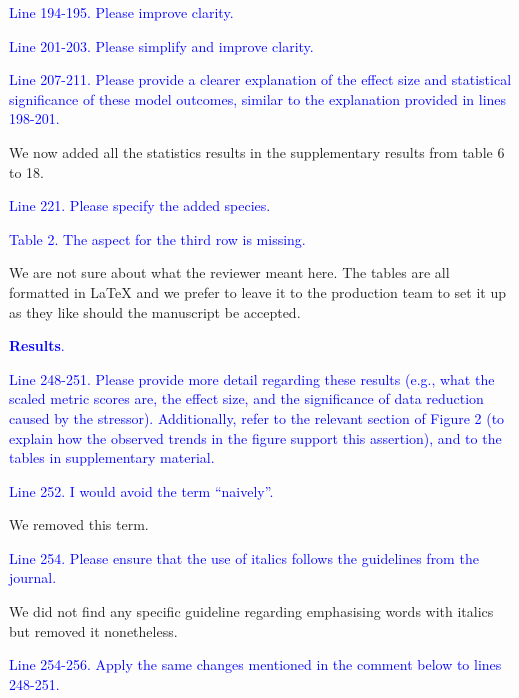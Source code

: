 \documentclass[
]{article}
\begin{document}
\textcolor{blue}{Line 194-195. Please improve clarity.}


\textcolor{blue}{Line 201-203. Please simplify and improve clarity.}


\textcolor{blue}{Line 207-211. Please provide a clearer explanation of the effect size and statistical significance of these model outcomes, similar to the explanation provided in lines 198-201.}

We now added all the statistics results in the supplementary results from table 6 to 18.

\textcolor{blue}{Line 221. Please specify the added species.}


\textcolor{blue}{Table 2. The aspect for the third row is missing.}

We are not sure about what the reviewer meant here.
The tables are all formatted in LaTeX and we prefer to leave it to the production team to set it up as they like should the manuscript be accepted.

\textcolor{blue}{\textbf{Results}.}

\textcolor{blue}{Line 248-251. Please provide more detail regarding these results (e.g., what the scaled metric scores are, the effect size, and the significance of data reduction caused by the stressor). Additionally, refer to the relevant section of Figure 2 (to explain how the observed trends in the figure support this assertion), and to the tables in supplementary material.}


\textcolor{blue}{Line 252. I would avoid the term ``naively''.}

We removed this term.

\textcolor{blue}{Line 254. Please ensure that the use of italics follows the guidelines from the journal.}

We did not find any specific guideline regarding emphasising words with italics but removed it nonetheless.

\textcolor{blue}{Line 254-256. Apply the same changes mentioned in the comment below to lines 248-251.}
\end{document}
